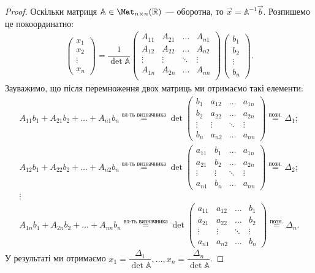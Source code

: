 \documentclass{math_library}
\begin{document}
\begin{proof}
Оскільки матриця $\mathbb{A} \in \Mat_{n \times n}(\mathbb{R})$ --- оборотна, то $\vec{x} = \mathbb{A}^{-1} \vec{b}$. Розпишемо це покоординатно:
\begin{align*}
\begin{pmatrix}
x_1 \\ x_2 \\ \vdots \\ x_n
\end{pmatrix} = \dfrac{1}{\det \mathbb{A}} \begin{pmatrix}
A_{11} & A_{21} & \dots & A_{n1} \\
A_{12} & A_{22} & \dots & A_{n2} \\
\vdots & \vdots & \ddots & \vdots \\
A_{1n} & A_{2n} & \dots & A_{nn} \\
\end{pmatrix} \begin{pmatrix}
b_1 \\ b_2 \\ \vdots \\ b_n
\end{pmatrix}.
\end{align*}
Зауважимо, що після перемноження двох матриць ми отримаємо такі елементи:
\begin{align*}
A_{11}b_1 + A_{21}b_2 + \dots + A_{n1}b_n \overset{\textrm{вл-ть визначника}}{=} \det \begin{pmatrix}
b_1  & a_{12} & \dots & a_{1n} \\
b_2 & a_{22} & \dots & a_{2n} \\
\vdots & \vdots & \ddots & \vdots \\
b_n & a_{n2} & \dots & a_{nn}
\end{pmatrix} \overset{\text{позн.}}{=} \Delta_1;\\
A_{12}b_1 + A_{22}b_2 + \dots + A_{n2}b_n \overset{\textrm{вл-ть визначника}}{=} \det \begin{pmatrix}
a_{11}  & b_1 & \dots & a_{1n} \\
a_{21} & b_2 & \dots & a_{2n} \\
\vdots & \vdots & \ddots & \vdots \\
a_{n1} & b_n & \dots & a_{nn}
\end{pmatrix} \overset{\text{позн.}}{=} \Delta_2;\\
\vdots \\
A_{1n}b_1 + A_{2n}b_2 + \dots + A_{nn}b_n \overset{\textrm{вл-ть визначника}}{=} \det \begin{pmatrix}
a_{11}  & a_{12} & \dots & b_1 \\
a_{21} & a_{22} & \dots & b_2 \\
\vdots & \vdots & \ddots & \vdots \\
a_{n1} & a_{n2} & \dots & b_n
\end{pmatrix} \overset{\text{позн.}}{=} \Delta_n.
\end{align*}
У результаті ми отримаємо $x_1 = \dfrac{\Delta_1}{\det \mathbb{A}},\dots, x_n = \dfrac{\Delta_n}{\det \mathbb{A}}$.
\end{proof}
\end{document}

